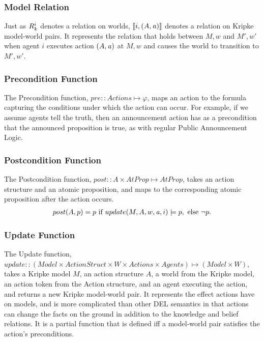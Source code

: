 \subsubsection{Model Relation}
Just as $R_{k}^i$ denotes a relation on worlds, $\llbracket i,(A,\mathit{a}) \rrbracket$ denotes a relation on Kripke model-world pairs. It represents the relation that holds between $M,w$ and $M',w'$ when agent $i$ executes action $(A,\mathit{a})$ at $M,w$ and causes the world to transition to $M',w'$.


\subsubsection{Precondition Function}
The Precondition function, $pre :: Actions \mapsto \varphi$, maps an action to the formula capturing the conditions under which the action can occur. For example, if we assume agents tell the truth, then an announcement action has as a precondition that the announced proposition is true, as with regular Public Announcement Logic. 



\subsubsection{Postcondition Function}
The Postcondition function, $post :: A \times AtProp \mapsto AtProp$, takes an action structure and an atomic proposition, and maps to the corresponding atomic proposition after the action occurs.
\begin{align*}
post(A,p)= p\ \mbox{if}\ update(M,A,w,\laa,i)\models p,\  \mbox{else}\ \tlnot p.
\end{align*} 

\subsubsection{Update Function}
The Update function, $update :: (Model \times ActionStruct \times W \times Actions \times Agents) \mapsto (Model \times W)$, takes a Kripke model $M$, an action structure $A$, a world from the Kripke model, an action token from the Action structure, and an agent executing the action, and returns a new Kripke model-world pair. It represents the effect actions have on models, and is more complicated than other DEL semantics in that actions can change the facts on the ground in addition to the knowledge and belief relations. It is a partial function that is defined iff a model-world pair satisfies the action's preconditions.
\\

